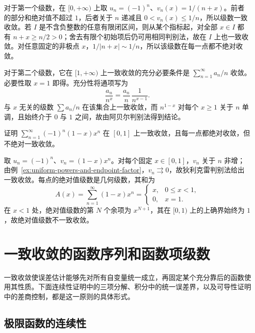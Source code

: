 \begin{solve}
对于第一个级数，在 $[0,+\infty)$ 上取 $u_n=(-1)^n$、$v_n(x)=1/(n+x)$。前者的部分和绝对值不超过 $1$，后者关于 $n$ 递减且 $0<v_n(x)\leq1/n$，所以级数一致收敛。若 $I$ 是不含负整数的任意有限闭区间，则从某个指标起，对全部 $x\in I$ 都有 $n+x\geq n/2>0$；舍去有限个初始项后仍可用相同判别法，故在 $I$ 上也一致收敛。对任意固定的非极点 $x$，$1/|n+x|\sim1/n$，所以该级数在每一点都不绝对收敛。

对于第二个级数，它在 $[1,+\infty)$ 上一致收敛的充分必要条件是 $\sum_{n=1}^\infty a_n/n$ 收敛。必要性取 $x=1$ 即得。充分性将通项写为
\[
    \frac{a_n}{n^x}=\frac{a_n}{n}\,\frac1{n^{x-1}}.
\]
与 $x$ 无关的级数 $\sum a_n/n$ 在该集合上一致收敛，而 $n^{1-x}$ 对每个 $x\geq1$ 关于 $n$ 单调，且始终介于 $0$ 与 $1$ 之间，故由阿贝尔判别法得到结论。
\end{solve}

\begin{example}
\label{ex:uniform-and-pointwise-absolute-not-absolute-uniform}
证明 $\sum_{n=1}^\infty(-1)^n(1-x)x^n$ 在 $[0,1]$ 上一致收敛，且每一点都绝对收敛，但不绝对一致收敛。
\end{example}

\begin{solve}
取 $u_n=(-1)^n$、$v_n=(1-x)x^n$。对每个固定 $x\in[0,1]$，$v_n$ 关于 $n$ 非增；由例~\ref{ex:uniform-powers-and-endpoint-factor}，$v_n\rightrightarrows0$，故狄利克雷判别法给出一致收敛。每点的绝对值级数是几何级数，其和为
\[
    A(x)=\sum_{n=1}^\infty(1-x)x^n
    =\begin{cases}x,&0\leq x<1,\\0,&x=1.\end{cases}
\]
在 $x<1$ 处，绝对值级数的第 $N$ 个余项为 $x^{N+1}$，其在 $[0,1)$ 上的上确界始终为 $1$，故绝对值级数不一致收敛。
\end{solve}

\section{一致收敛的函数序列和函数项级数}
\label{sec:uniformly-convergent-function-sequences-and-series}

一致收敛使误差估计能够先对所有自变量统一成立，再固定某个充分靠后的函数使用其性质。下面连续性证明中的三项分解、积分中的统一误差界，以及可导性证明中的差商控制，都是这一原则的具体形式。

\subsection{极限函数的连续性}
\label{subsec:continuity-of-limit-functions}

